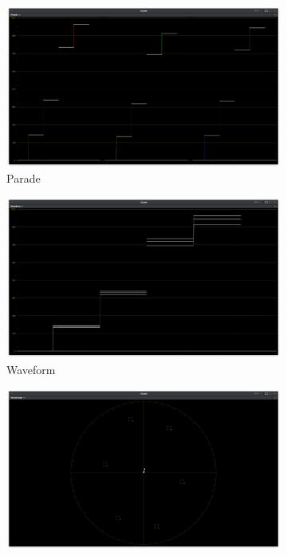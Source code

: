 \begin{figure}[ht!]
\begin{subfigure}[b]{0.475\textwidth}
            \centering 
            \includegraphics[width=\textwidth]{images/p3dci/p3dci_parade}
            \caption[Parade]%
            {{\small Parade}}    
            \label{fig:parade-p3dci}
        \end{subfigure}
        \quad
        \begin{subfigure}[b]{0.475\textwidth}   
            \centering 
            \includegraphics[width=\textwidth]{images/p3dci/p3dci_waveform}
            \caption[]%
            {{\small Waveform}}    
            \label{fig:wf-p3dci}
        \end{subfigure}
        \begin{subfigure}[b]{0.475\textwidth}   
            \centering 
            \includegraphics[width=\textwidth]{images/p3dci/p3dci_vectorscope}

\end{subfigure}
\end{figure}
